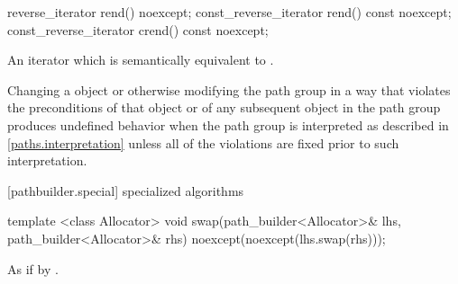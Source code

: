 %
%
\begin{itemdecl}
reverse_iterator rend() noexcept;
const_reverse_iterator rend() const noexcept;
const_reverse_iterator crend() const noexcept;
\end{itemdecl}
\begin{itemdescr}
\pnum
\returns
An iterator which is semantically equivalent to .

\pnum
\remarks
Changing a  object or otherwise modifying the path group in a way that violates the preconditions of that  object or of any subsequent  object in the path group produces undefined behavior when the path group is interpreted as described in \ref{paths.interpretation} unless all of the violations are fixed prior to such interpretation.
\end{itemdescr}

[pathbuilder.special] { specialized algorithms}%

%
\begin{itemdecl}
template <class Allocator>
void swap(path_builder<Allocator>& lhs, path_builder<Allocator>& rhs)
  noexcept(noexcept(lhs.swap(rhs)));
\end{itemdecl}
\begin{itemdescr}
\pnum
\effects
As if by .
\end{itemdescr}
